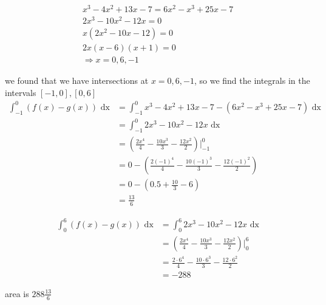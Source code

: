 \documentclass[a4paper,12pt]{article}
\newcommand{\?}{\stackrel{?}{=}}
\begin{document}
\begin{definition}
\begin{my_example}
\begin{gather*}
  x^3-4x^2+13x-7=6x^2-x^3+25x-7\\
  2x^3-10x^2-12x=0\\
  x(2x^2-10x-12)=0\\
  2x(x-6)(x+1)=0\\
  \Rightarrow x=0,6,-1
\end{gather*}

we found that we have intersections at \(x=0,6,-1\), so we find the integrals in the intervals \([-1,0],[0,6]\)\\[0pt]

\begin{align*}
  \int_{-1}^0 (f(x)-g(x)) \text{ dx} &= \int_{-1}^0 x^3-4x^2+13x-7-(6x^2-x^3+25x-7) \text{ dx}\\
  &= \int_{-1}^0 2x^3 - 10x^2 - 12x \text{ dx}\\
  &= \left(\frac{2x^4}{4} - \frac{10x^3}{3} - \frac{12x^2}{2}\right) \Big|_{-1}^0\\
  &= 0-\left(\frac{2(-1)^4}{4} - \frac{10(-1)^3}{3} - \frac{12(-1)^2}{2}\right)\\
  &= 0-\left(0.5 + \frac{10}{3} - 6\right)\\
  &= \frac{13}{6}
\end{align*}

\begin{align*}
  \int_0^6 (f(x)-g(x)) \text{ dx} &= \int_0^6 2x^3 - 10x^2 - 12x \text{ dx}\\
  &= \left(\frac{2x^4}{4} - \frac{10x^3}{3} - \frac{12x^2}{2}\right) \Big|_0^6\\
  &= \frac{2 \cdot 6^4}{4} - \frac{10 \cdot 6^3}{3} - \frac{12 \cdot 6^2}{2}\\
  &= -288
\end{align*}

area is \(288\frac{13}{6}\)\\[0pt]
\end{my_example}
\end{definition}
\end{document}

